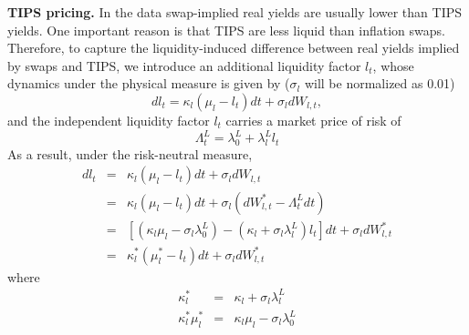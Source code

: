 \documentclass{article}
\begin{document}
\textbf{TIPS pricing.} In the data swap-implied real yields are usually
lower than TIPS yields. One important reason is that TIPS are less liquid
than inflation swaps. Therefore, to capture the liquidity-induced difference
between real yields implied by swaps and TIPS, we introduce an additional
liquidity factor $l_{t}$, whose dynamics under the physical measure is given
by ($\sigma _{l}$ will be normalized as 0.01)%
\begin{equation*}
dl_{t}=\kappa _{l}\left( \mu _{l}-l_{t}\right) dt+\sigma _{l}dW_{l,t},
\end{equation*}%
and the independent liquidity factor $l_{t}$ carries a market price of risk
of%
\begin{equation*}
\Lambda _{t}^{L}=\lambda _{0}^{L}+\lambda _{l}^{L}l_{t}
\end{equation*}%
As a result, under the risk-neutral measure, 
\begin{eqnarray*}
dl_{t} &=&\kappa _{l}\left( \mu _{l}-l_{t}\right) dt+\sigma _{l}dW_{l,t} \\
&=&\kappa _{l}\left( \mu _{l}-l_{t}\right) dt+\sigma _{l}\left(
dW_{l,t}^{\ast }-\Lambda _{t}^{L}dt\right)  \\
&=&\left[ \left( \kappa _{l}\mu _{l}-\sigma _{l}\lambda _{0}^{L}\right)
-\left( \kappa _{l}+\sigma _{l}\lambda _{l}^{L}\right) l_{t}\right]
dt+\sigma _{l}dW_{l,t}^{\ast } \\
&=&\kappa _{l}^{\ast }\left( \mu _{l}^{\ast }-l_{t}\right) dt+\sigma
_{l}dW_{l,t}^{\ast }
\end{eqnarray*}%
where%
\begin{eqnarray*}
\kappa _{l}^{\ast } &=&\kappa _{l}+\sigma _{l}\lambda _{l}^{L} \\
\kappa _{l}^{\ast }\mu _{l}^{\ast } &=&\kappa _{l}\mu _{l}-\sigma
_{l}\lambda _{0}^{L}
\end{eqnarray*}
\end{document}
